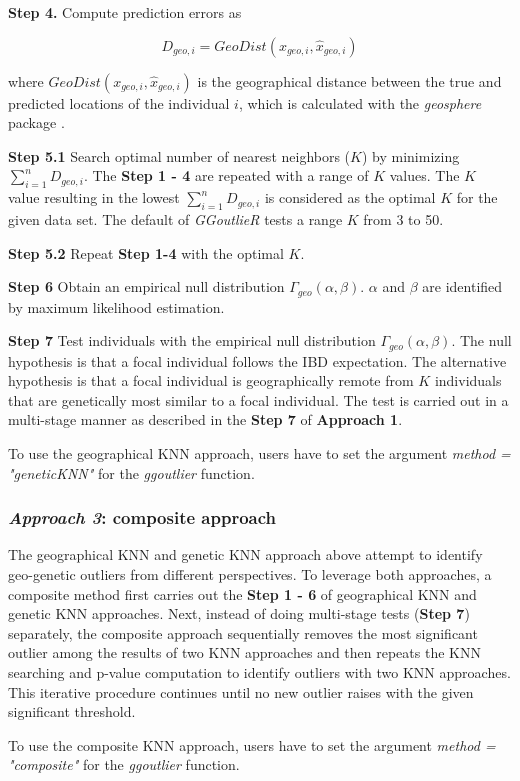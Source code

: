 \documentclass[11pt]{article}
\begin{document}
\textbf{Step 4.} Compute prediction errors as

\begin{equation} \label{Dgeo_eq}
D_{geo, i}=GeoDist(x_{geo,i}, \hat{x}_{geo,i})
\end{equation}

where $GeoDist(x_{geo,i}, \hat{x}_{geo,i})$ is the geographical distance between the true and predicted locations of the individual $i$, which is calculated with the \textit{geosphere} package \citep{hijmansgeosphere}.

\textbf{Step 5.1} Search optimal number of nearest neighbors ($K$) by minimizing $\sum_{i=1}^{n}D_{geo,i}$.
The \textbf{Step 1 - 4} are repeated with a range of $K$ values.
The $K$ value resulting in the lowest $\sum_{i=1}^{n}D_{geo,i}$ is considered as the optimal $K$ for the given data set.
The default of \textit{GGoutlieR} tests a range $K$ from 3 to 50.

\textbf{Step 5.2} Repeat \textbf{Step 1-4} with the optimal $K$.

\textbf{Step 6} Obtain an empirical null distribution $\Gamma_{geo}(\alpha,\beta)$. $\alpha$ and $\beta$ are identified by maximum likelihood estimation.

\textbf{Step 7} Test individuals with the empirical null distribution $\Gamma_{geo}(\alpha,\beta)$.
The null hypothesis is that a focal individual follows the IBD expectation. The alternative hypothesis is that a focal individual is geographically remote from $K$ individuals that are genetically most similar to a focal individual.
The test is carried out in a multi-stage manner as described in the \textbf{Step 7} of \textbf{Approach 1}.

To use the geographical KNN approach, users have to set the argument \textit{method = "geneticKNN"} for the \textit{ggoutlier} function.

\subsubsection*{\textit{Approach 3}: composite approach}

The geographical KNN and genetic KNN approach above attempt to identify geo-genetic outliers from different perspectives.
To leverage both approaches, a composite method first carries out the \textbf{Step 1 - 6} of geographical KNN and genetic KNN approaches.
Next, instead of doing multi-stage tests (\textbf{Step 7}) separately, the composite approach sequentially removes the most significant outlier among the results of two KNN approaches and then repeats the KNN searching and p-value computation to identify outliers with two KNN approaches.
This iterative procedure continues until no new outlier raises with the given significant threshold.

To use the composite KNN approach, users have to set the argument \textit{method = "composite"} for the \textit{ggoutlier} function.


\newpage



\end{document}
